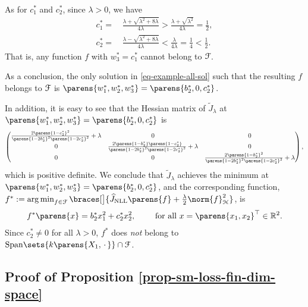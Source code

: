 	As for $c_1^*$ and $c_2^*$, since $\lambda > 0$, we have 
	\begin{align*}
		c_1^* = & \, \frac{\lambda + \sqrt{\lambda^2 + 8 \lambda}}{4 \lambda} > \frac{\lambda + \sqrt{\lambda^2}}{4 \lambda} = \frac{1}{2}, \\ 
		c_2^* = & \, \frac{\lambda - \sqrt{\lambda^2 + 8 \lambda}}{4 \lambda} < \frac{\lambda}{4 \lambda} = \frac{1}{4} < \frac{1}{2}. 
	\end{align*}
	That is, any function $f$ with $w_3^* = c_1^*$ cannot belong to $\mathcal{F}$. 
	
	As a conclusion, the only solution in \eqref{eq-example-all-sol} such that the resulting $f$ belongs to $\mathcal{F}$ is $\parens{w_1^*, w_2^*, w_3^*} = \parens{b_2^*, 0, c_2^*}$. 
	
	In addition, it is easy to see that the Hessian matrix of $\widetilde{J}_{\lambda}$ at $\parens{w_1^*, w_2^*, w_3^*} = \parens{b_2^*, 0, c_2^*}$ is 
	\begin{align*}
		\begin{pmatrix}
			\frac{2 \parens{1 - c_2^*}^2}{\parens{1 - 2b_2^*}^2 \parens{1 - 2c_2^*}^2} + \lambda & 0 & 0 \\ 
			0 & \frac{2 \parens{1 - b_2^*} \parens{1 - c_2^*}}{\parens{1 - 2b_2^*}^2 \parens{1 - 2c_2^*}^2} + \lambda & 0 \\ 
			0 & 0 & \frac{2 \parens{1 - b_2^*}^2}{\parens{1 - 2b_2^*}^2 \parens{1 - 2c_2^*}^2} + \lambda
		\end{pmatrix}, 
	\end{align*}
	which is positive definite. We conclude that $\widetilde{J}_{\lambda}$ achieves the minimum at $\parens{w_1^*, w_2^*, w_3^*} = \parens{b_2^*, 0, c_2^*}$, and the corresponding function, $f^* := \argmin_{f \in \calF} \braces[\big]{\widehat{J}_{\NLL} \parens{f} + \frac{\lambda}{2} \norm{f}_{\calH}^2}$, is 
	\begin{align*}%
		f^* \parens{x} = b_2^* x_1^2 + c_2^* x_2^2, \qquad \text{ for all } x = \parens{x_1, x_2}^\top \in \Real^2. 
	\end{align*}
	Since $c_2^* \neq 0$ for all $\lambda > 0$, $f^*$ does \emph{not} belong to $\mathrm{Span} \sets{k \parens{X_1, \,\cdot\,}} \cap \calF$. \hfill \qedsymbol


\subsection{Proof of Proposition \ref{prop-sm-loss-fin-dim-space}}\label{proof-prop-sm-loss-fin-dim-space}

